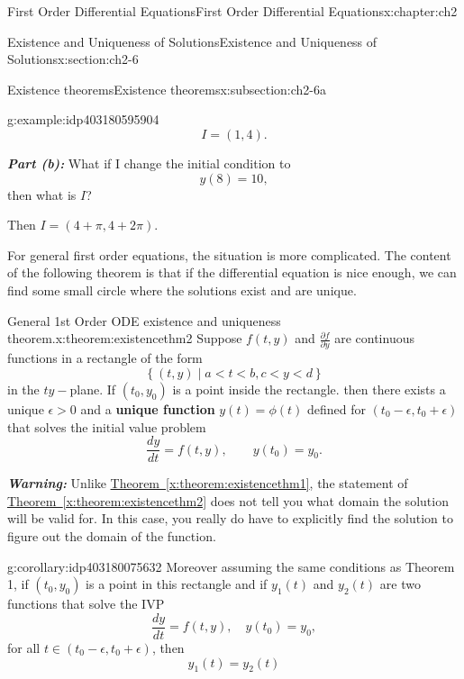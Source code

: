 \documentclass[oneside,10pt,]{book}
\newcommand{\xreffont}{\relax}
\newcommand{\alert}[1]{\textbf{\textit{#1}}}
\newcommand{\terminology}[1]{\textbf{#1}}
\numberwithin{equation}{section}
\numberwithin{equation}{section}
\newcommand{\lt}{<}
\begin{document}
\begin{chapterptx}{First Order Differential Equations}{}{First Order Differential Equations}{}{}{x:chapter:ch2}
\begin{sectionptx}{Existence and Uniqueness of Solutions}{}{Existence and Uniqueness of Solutions}{}{}{x:section:ch2-6}
\begin{subsectionptx}{Existence theorems}{}{Existence theorems}{}{}{x:subsection:ch2-6a}
\begin{example}{}{g:example:idp403180595904}
\begin{equation*}
I=(1,4).
\end{equation*}
%
\par
\alert{Part (b):} What if I change the initial condition to%
\begin{equation*}
y(8)=10,
\end{equation*}
then what is \(I\)?%
\par
Then \(I=\left(4+\pi,4+2\pi\right)\).%
\end{example}
For general first order equations, the situation is more complicated. The content of the following theorem is that if the differential equation is nice enough, we can find some small circle where the solutions exist and are unique.%
\begin{theorem}{General 1st Order ODE existence and uniqueness theorem.}{}{x:theorem:existencethm2}%
Suppose \(f(t,y)\) and \(\frac{\partial f}{\partial y}\) are continuous functions in a rectangle of the form%
\begin{equation*}
\left\{ \left(t,y\right)\mid a\lt t\lt b,c \lt y \lt d\right\}
\end{equation*}
in the \(ty-\)plane. If \((t_{0},y_{0})\) is a point inside the rectangle. then there exists a unique \(\epsilon>0\) and a \terminology{unique function} \(y(t)=\phi(t)\) defined for \(\left(t_{0}-\epsilon,t_{0}+\epsilon\right)\) that solves the initial value problem%
\begin{equation*}
\frac{dy}{dt}=f(t,y),\qquad y(t_{0})=y_{0}.
\end{equation*}
%
\end{theorem}
\alert{Warning:} Unlike \hyperref[x:theorem:existencethm1]{Theorem~{\xreffont\ref{x:theorem:existencethm1}}}, the statement of \hyperref[x:theorem:existencethm2]{Theorem~{\xreffont\ref{x:theorem:existencethm2}}} does not tell you what domain the solution will be valid for. In this case, you really do have to explicitly find the solution to figure out the domain of the function.%
\begin{corollary}{}{}{g:corollary:idp403180075632}%
Moreover assuming the same conditions as Theorem 1, if \((t_{0},y_{0})\) is a point in this rectangle and if \(y_{1}(t)\) and \(y_{2}(t)\) are two functions that solve the IVP%
\begin{equation*}
\frac{dy}{dt}=f(t,y),\quad y(t_{0})=y_{0},
\end{equation*}
for all \(t\in\left(t_{0}-\epsilon,t_{0}+\epsilon\right)\), then%
\begin{equation*}
y_{1}(t)=y_{2}(t)
\end{equation*}

\end{corollary}
\end{subsectionptx}
\end{sectionptx}
\end{chapterptx}
\end{document}
